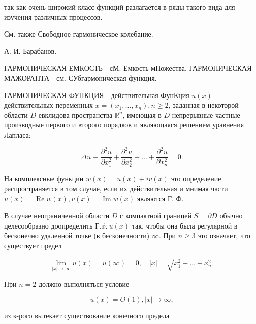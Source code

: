 \documentclass[10pt]{article}
\begin{document}
так как очень широкий класс функций разлагается в ряды такого вида для изучения различных процессов.



См. также Свободное гармоническое колебание.



А. И. Барабанов.



ГАРМОНИЧЕСКАЯ ЕМКОСТЬ - сМ. Емкость мНожества. ГАРМОНИЧЕСКАЯ МАЖОРАНТА - см. СУбгармоническая функция.



ГАРМОНИЧЕСКАЯ ФУНКЦИЯ - действительная ФунКция $u(x)$ действительных переменных $x=\left(x_{1}, \ldots, x_{n}\right), n \geqslant 2$, заданная в некоторой области $D$ евклидова пространства $\mathbb{R}^{n}$, имеющая в $D$ непрерывные частные производные первого и второго порядков и являющаяся решением уравнения Лапласа:



\[

\Delta u \equiv \frac{\partial^{2} u}{\partial x_{1}^{2}}+\frac{\partial^{2} u}{\partial x_{2}^{2}}+\ldots+\frac{\partial^{2} u}{\partial x_{n}^{2}}=0 .

\]



На комплексные функции $w(x)=u(x)+i v(x)$ это определение распространяется в том случае, если их действительная и мнимая части $u(x)=\operatorname{Re} w(x), v(x)=\operatorname{Im} w(x)$ являются Г. Ф.



В случае неограниченной области $D$ с компактной границей $S=\partial D$ обычно целесообразно доопределить $Г . \phi . ~ u(x)$ так, чтобы она была регулярной в бесконечно удаленной точке (в бесконечности) $\infty$. При $n \geqslant 3$ это означает, что существует предел



\[

\lim _{|x| \rightarrow \infty} u(x)=u(\infty)=0, \quad|x|=\sqrt{x_{1}^{2}+\ldots+x_{n}^{2}} .

\]



При $n=2$ должно выполняться условие



\[

u(x)=O(1),|x| \rightarrow \infty,

\]



из к-рого вытекает существование конечного предела
\end{document}
